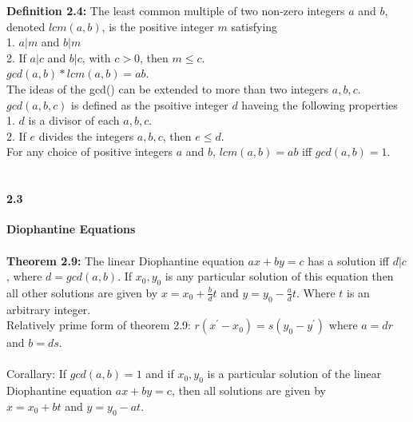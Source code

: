 \documentclass[14pt]{extreport}
\begin{document}
\textbf{Definition 2.4:} The least common multiple of two non-zero integers $a$ and $b$, denoted $lcm(a,b)$, is the positive integer $m$ satisfying\\

1. $a|m$ and $b|m$\\
2. If $a|c$ and $b|c$, with $c > 0$, then $m \le c$.\\

$gcd(a,b) * lcm(a, b) = ab$.\\

The ideas of the gcd() can be extended to more than two integers $a, b, c$. $gcd(a, b, c)$ is defined as the psoitive integer $d$ haveing the following properties\\

1. $d$ is a divisor of each $a, b, c$.\\
2. If $e$ divides the integers $a, b, c$, then $e \le d$.\\

For any choice of positive integers $a$ and $b$, $lcm(a,b) = ab$ iff $gcd(a,b) = 1$.\\\\

\paragraph{2.3} \textbf{Diophantine Equations}\\\\

\textbf{Theorem 2.9:} The linear Diophantine equation $ax + by = c$ has a solution iff $d|c$, where $d = gcd(a, b)$. If $x_0, y_0$ is any particular solution of this equation then all other solutions 
are given by $x = x_0 + \frac{b}{d} t$ and $y = y_0-\frac{a}{d} t$. Where $t$ is an arbitrary integer.\\

Relatively prime form of theorem 2.9: $r(x^' - x_0) = s(y_0 - y^')$ where $a = dr$ and $b=ds$.\\\\

Corallary: If $gcd(a,b) = 1$ and if $x_0, y_0$ is a particular solution of the linear Diophantine equation $ax + by = c$, then all solutions are given by\\
$x = x_0 + bt$ and $y = y_0 - at$.\\
\end{document}
